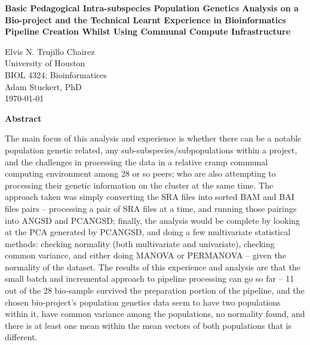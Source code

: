 \documentclass[12pt, a4paper]{article}
\title{\thetitle}
\author{\theauthor}
\newcommand{\thetitle}{Basic Pedagogical Intra-subspecies Population Genetics Analysis on a Bio-project and the Technical Learnt Experience in Bioinformatics Pipeline Creation Whilst Using Communal Compute Infrastructure}
\newcommand{\theauthor}{Elvis N. Trujillo Chairez}
\newcommand{\affiliation}{University of Houston}
\newcommand{\coursename}{BIOL 4324: Bioinformatices}
\newcommand{\instructor}{Adam Stuckert, PhD}
\newcommand{\duedate}{\today} %
\begin{document}
\begin{titlepage}
    \centering
    \vspace*{3cm} %

    \textbf{\huge \thetitle}

    \vspace{2cm} %

    \large
    \theauthor \\
    \vspace{0.5cm}
    \affiliation \\
    \vspace{0.5cm}
    \coursename \\
    \vspace{0.5cm}
    \instructor \\
    \vspace{0.5cm}
    \duedate

    \vfill %
\end{titlepage}


\newpage
\begin{center}
    \textbf{Abstract}
\end{center}
\par \indent The main focus of this analysis and experience is whether there can be a notable population genetic related, any sub-subspecies/subpopulations within a project, and the challenges in processing the data in a relative cramp communal computing environment among 28 or so peers; who are also attempting to processing their genetic information on the cluster at the same time. The approach taken was simply converting the SRA files into sorted BAM and BAI files pairs -- processing a pair of SRA files at a time, and running those pairings into ANGSD and PCANGSD; finally, the analysis would be complete by looking at the PCA generated by PCANGSD, and doing a few multivariate statistical methods: checking normality (both multivariate and univariate), checking common variance, and either doing MANOVA or PERMANOVA -- given the normality of the dataset. The results of this experience and analysis are that the small batch and incremental approach to pipeline processing can go so far -- 11 out of the 28 bio-sample survived the preparation portion of the pipeline, and the chosen bio-project's population genetics data seem to have two populations within it, have common variance among the populations, no normality found, and there is at least one mean within the mean vectors of both populations that is different.
\end{document}
